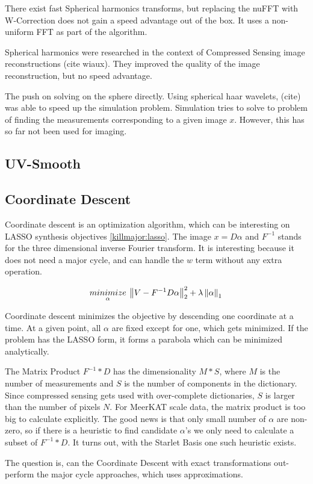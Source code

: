 There exist fast Spherical harmonics transforms, but replacing the nuFFT with W-Correction does not gain a speed advantage out of the box. It uses a non-uniform FFT as part of the algorithm.

Spherical harmonics were researched in the context of Compressed Sensing image reconstructions (cite wiaux). They improved the quality of the image reconstruction, but no speed advantage.

The push on solving on the sphere directly. Using spherical haar wavelets, (cite) was able to speed up the simulation problem. Simulation tries to solve to problem of finding the measurements corresponding to a given image $x$. However, this has so far not been used for imaging.


\subsection{UV-Smooth}



\subsection{Coordinate Descent}
Coordinate descent is an optimization algorithm, which can be interesting on LASSO synthesis objectives \eqref{killmajor:lasso}. The image $x = D\alpha$ and $F^{-1}$ stands for the three dimensional inverse Fourier transform. It is interesting because it does not need a major cycle, and can handle the $w$ term without any extra operation.

\begin{equation}\label{killmajor:lasso}
\underset{\alpha}{minimize} \: \left \| V - F^{-1}D \alpha \right \|_2^2 + \lambda \left \| \alpha \right \|_1 \\
\end{equation}

Coordinate descent minimizes the objective by descending one coordinate at a time. At a given point, all $\alpha$ are fixed except for one, which gets minimized. If the problem has the LASSO form, it forms a parabola which can be minimized analytically.

The Matrix Product $F^{-1}*D$ has the dimensionality $M*S$, where $M$ is the number of measurements and $S$ is the number of components in the dictionary. Since compressed sensing gets used with over-complete dictionaries, $S$ is larger than the number of pixels $N$. For MeerKAT scale data, the matrix product is too big to calculate explicitly.  The good news is that only small number of $\alpha$ are non-zero, so if there is a heuristic to find candidate $\alpha$'s we only need to calculate a subset of $F^{-1}*D$. It turns out, with the Starlet Basis one such heuristic exists.

The question is, can the Coordinate Descent with exact transformations out-perform the major cycle approaches, which uses approximations.


